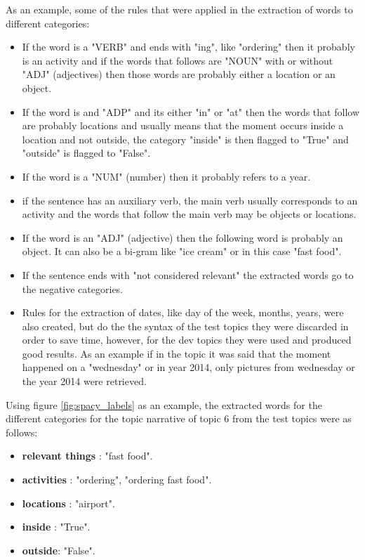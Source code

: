   
  
  As an example, some of the rules that were applied in the extraction of words to different categories:
  
  \begin{itemize}
      \item  If the word is a "VERB" and ends with "ing", like "ordering" then it probably is an activity and if the words that follows are "NOUN" with or without "ADJ" (adjectives) then those words are probably either a location or an object.
      \item  If the word is and "ADP" and its either "in" or "at" then the words that follow are probably locations and usually means that the moment occurs inside a location and not outside, the category "inside" is then flagged to "True" and "outside" is flagged to "False".
      \item If the word is a "NUM" (number) then it probably refers to a year.
      \item if the sentence has an auxiliary verb, the main verb usually corresponds to an activity and the words that follow the main verb may be objects or locations.
      \item If the word is an "ADJ" (adjective) then the following word is probably an object. It can also be a bi-gram like "ice cream" or in this case "fast food".
      \item If the sentence ends with "not considered relevant" the extracted words go to the negative categories.
      \item Rules for the extraction of dates, like day of the week, months, years, were also created, but do the the syntax of the test topics they were discarded in order to save time, however, for the dev topics they were used and produced good results. As an example if in the topic it was said that the moment happened on a "wednesday" or in year 2014, only pictures from wednesday or the year 2014 were retrieved.

    \end{itemize}


Using figure \ref{fig:spacy_labels} as an example, the extracted words for the different categories for the topic narrative of topic 6 from the test topics were as follows:

    \begin{itemize}
        \item \textbf{relevant things} : "fast food".
        \item \textbf{activities} : "ordering", "ordering fast food".
        \item \textbf{locations} : "airport".
        \item \textbf{inside} : "True".
        \item \textbf{outside}: "False".
       
    \end{itemize}


